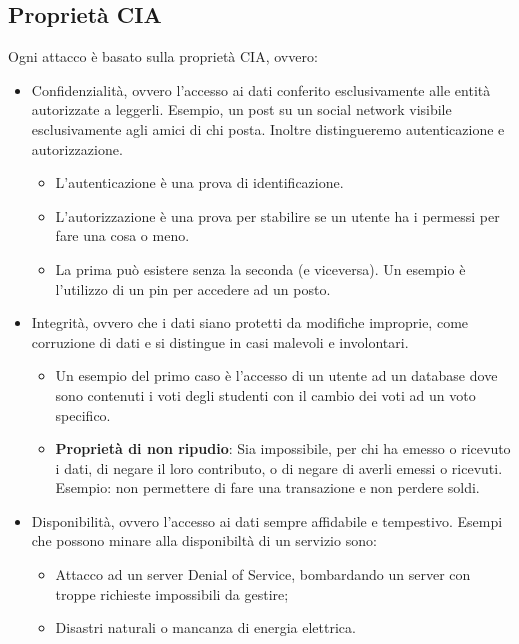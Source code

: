 \documentclass{article}
\begin{document}
\subsection{Proprietà CIA}
Ogni attacco è basato sulla proprietà CIA, ovvero:
\begin{itemize}
    \item Confidenzialità, ovvero l'accesso ai dati conferito esclusivamente alle entità autorizzate a leggerli. Esempio, un post su un social network visibile esclusivamente agli amici di chi posta. Inoltre distingueremo autenticazione e autorizzazione.
    \begin{itemize}
        \item L'autenticazione è una prova di identificazione.
        \item L'autorizzazione è una prova per stabilire se un utente ha i permessi per fare una cosa o meno.
        \item La prima può esistere senza la seconda (e viceversa). Un esempio è l'utilizzo di un pin per accedere ad un posto.
    \end{itemize}
    
    \item Integrità, ovvero che i dati siano protetti da modifiche improprie, come corruzione di dati e si distingue in casi malevoli e involontari. 
    \begin{itemize}
        \item Un esempio del primo caso è l'accesso di un utente ad un database dove sono contenuti i voti degli studenti con il cambio dei voti ad un voto specifico.
        \item \textbf{Proprietà di non ripudio}: Sia impossibile, per chi ha emesso o ricevuto i dati, di negare il loro contributo, o di negare di averli emessi o ricevuti.\\ Esempio: non permettere di fare una transazione e non perdere soldi.
    \end{itemize}

    \item Disponibilità, ovvero l'accesso ai dati sempre affidabile e tempestivo. Esempi che possono minare alla disponibiltà di un servizio sono:
    \begin{itemize}
        \item Attacco ad un server Denial of Service, bombardando un server con troppe richieste impossibili da gestire;
        \item Disastri naturali o mancanza di energia elettrica.
    \end{itemize}
\end{itemize}
\end{document}

